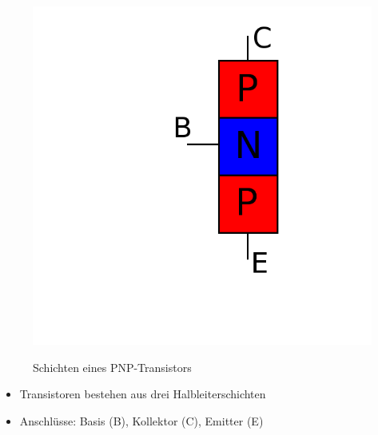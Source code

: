 \begin{frame}
\begin{minipage}{0.4\textwidth}
\begin{figure}
      \includegraphics[width=\textwidth,height=.4\textheight,keepaspectratio]{e13/PNP_hlb.png}\\
      \caption{Schichten eines \hbox{PNP-Transistors}}
    \end{figure}
  \end{minipage}
  \vspace{0.5cm}
  \begin{center}
    \begin{itemize}
      \item Transistoren bestehen aus drei Halbleiterschichten
      \item Anschlüsse: Basis (B), Kollektor (C), Emitter (E)
    \end{itemize}

  \end{center}
\end{frame}

